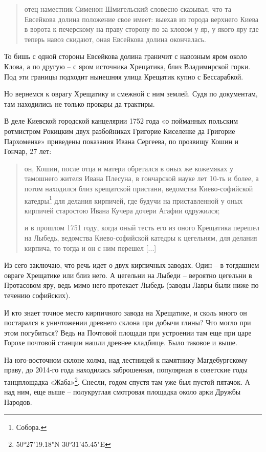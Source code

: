 \begin{quotation}
отец наместник Сименон Шмигельский словесно сказывал, что та Евсейкова долина положение свое имеет: выехав из города верхнего Киева в ворота к печерскому на праву сторону по за кловом у яр, у якого яру где теперь навоз скидают, оная Евсейкова долина окончалась.
\end{quotation}

То бишь с одной стороны Евсейкова долина граничит с навозным яром около Клова, а по другую – с яром источника Хрещатика, близ Владимирской горки. Под эти границы подходит нынешняя улица Крещатик купно с Бессарабкой.

Но вернемся к оврагу Хрещатику и смежной с ним землей. Судя по документам, там находились не только провары да трактиры.
 
В деле Киевской городской канцелярии 1752 года «о пойманных польским ротмистром Рокицким двух разбойниках Григорие Киселенке да Григорие Пархоменке» приведены показания Ивана Сергеева, по прозвищу Кошин и Гончар, 27 лет: 

\begin{quotation}
он, Кошин,  после отца и матери обретался в оных же кожемяках у тамошнего жителя Ивана Плесуна, в гончарской науке лет 10-ть и более, а потом находился близ крещатской пристани, ведомства Киево-софийской катедры\footnote{Собора.} для делания кирпичей, где будучи на приставленной у оных кирпичей старостою Ивана Кучера дочери Агафии одружился; 

и в прошлом 1751 году, когда оный тесть его из оного Крещатика перешел на Лыбедь, ведомства Киево-софийской катедры к цегельням, для делания кирпича, то тогда и он с ним перешел [...]
\end{quotation} 

Из сего заключаю, что речь идет о двух кирпичных заводах. Один – в тогдашнем овраге Хрещатике или близ него. А цегельни на Лыбеди – вероятно цегельни в Протасовом яру, ведь мимо него протекает Лыбедь (заводы Лавры были ниже по течению софийских).

И кто знает точное место кирпичного завода на Хрещатике, и сколь много он постарался в уничтожении древнего склона при добычи глины? Что могло при этом погубиться? Ведь на Почтовой площади при устроении там еще при царе Горохе почтовой станции нашли древнее кладбище. Было таковое и выше.

На юго-восточном склоне холма, над лестницей к памятнику Магдебургскому праву, до 2014-го года находилась заброшенная, популярная в советские годы танцплощадка «Жаба»\footnote{50°27'19.18"N 30°31'45.45"E}. Снесли, годом спустя там уже был пустой пятачок. А над ним, еще выше – полукруглая смотровая площадка около арки Дружбы Народов. 

